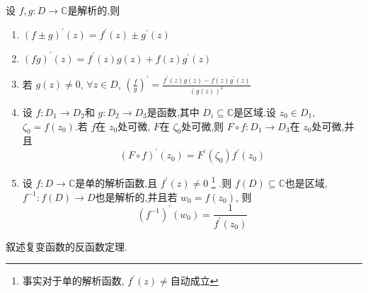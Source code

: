 \documentclass[../../复变函数.tex]{subfiles}
\begin{document}
\begin{proposition}
    设 \(  f,g: D\to \mathbb{C}   \)是解析的,则
    \begin{enumerate}
        \item  \(  \left( f\pm  g\right)   ^{\prime} \left( z \right)= f^{\prime} \left( z \right) \pm g^{\prime} \left( z \right)    \)
        \item  \(  \left( fg \right)^{\prime} \left( z \right)= f^{\prime} \left( z \right) g\left( z \right)+  f\left( z \right)g^{\prime} \left( z \right)        \)  
        \item 若 \(  g\left( z \right)\neq 0   \), \(  \forall z \in D  \), \(  \left( \frac{f }{g }  \right)^{\prime}  =   \frac{f^{\prime} \left( z \right)g\left( z \right)-f\left( z \right)g^{\prime} \left( z \right)     }{ \left( g\left( z \right)  \right)^{2}  }    \)
        \item    设 \(  f: D_1\to D_2  \)和 \( g:D_2\to D_3  \)是函数,其中 \(  D_{i}\subseteq \mathbb{C}   \)是区域.设 \(  z_0 \in D_1  \),   \( \zeta _0 = f\left( z_0 \right)   \).若 \(  f  \)在 \(  z_0  \)处可微, \(  F  \)在 \(  \zeta _0   \)处可微,则 \(  F\circ f: D_1\to D_3  \)在 \(  z_0  \)处可微,并且 \[
        \left( F\circ f \right)^{\prime} \left( z_0 \right)= F^{\prime} \left( \zeta _0  \right)f^{\prime} \left( z_0 \right)    
        \]         
        \item 设 \(  f: D\to \mathbb{C}   \)是单的解析函数,且 \(  f^{\prime} \left( z\right)\neq 0   \)  \footnote{事实对于单的解析函数, \(  f^{\prime} \left( z \right)\neq    \)自动成立 } .则 \(  f\left( D \right)\subseteq \mathbb{C}    \)也是区域, \(  f^{-1}  : f\left( D \right)\to D   \)也是解析的,并且若 \(  w_0 =  f\left( z_0 \right)   \),   则 \[
        \left( f^{-1}  \right)^{\prime} \left( w_0 \right)=  \frac{1 }{f^{\prime} \left( z_0 \right)  }   
        \]
    \end{enumerate}
     
\end{proposition}
\begin{exercise}
    叙述复变函数的反函数定理.
\end{exercise}

\hspace*{\fill} 
\end{document}
